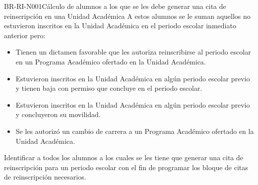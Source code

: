 \begin{BusinessRule}{BR-RI-N001}{Cálculo de alumnos a los que se les debe generar una cita de reinscripción en una Unidad Académica}
	A estos alumnos se le suman aquellos no estuvieron inscritos en la Unidad Académica en el periodo escolar inmediato anterior pero:
		\begin{itemize}
			\item Tienen un dictamen favorable que les autoriza reinscribirse al periodo escolar en un Programa Académico ofertado en la Unidad Académica.
			\item Estuvieron inscritos en la Unidad Académica en algún periodo escolar previo y tienen baja con permiso que concluye en el periodo escolar.
			\item Estuvieron inscritos en la Unidad Académica en algún periodo escolar previo y concluyeron su movilidad.
			\item Se les autorizó un cambio de carrera a un Programa Académico ofertado en la Unidad Académica.
		\end{itemize}
%
			
	\BRItem[Motivación] Identificar a todos los alumnos a los cuales se les tiene que generar una cita de reinscripción para un periodo escolar con el fin de programar los bloque de citas de reinscripción necesarios.

\end{BusinessRule}



